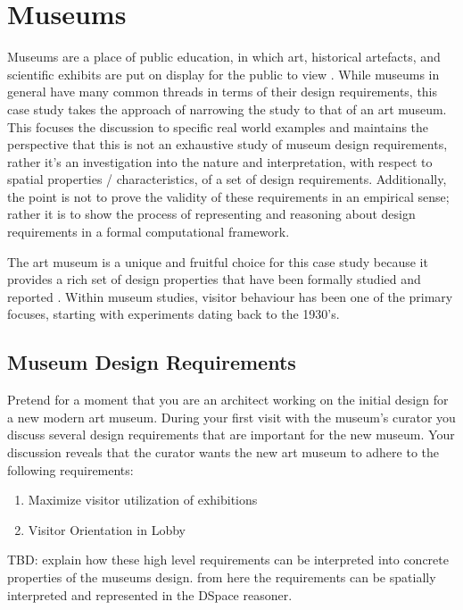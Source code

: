 \documentclass[12pt]{ucthesis}
\begin{document}
\section{Museums}
Museums are a place of public education, in which art, historical artefacts, and scientific exhibits are put on display for the public to view \cite{Falk}. While museums in general have many common threads in terms of their design requirements, this case study takes the approach of narrowing the study to that of an art museum. This focuses the discussion to specific real world examples and maintains the perspective that this is not an exhaustive study of museum design requirements, rather it's an investigation into the nature and interpretation, with respect to spatial properties / characteristics, of a set of design requirements. Additionally, the point is not to prove the validity of these requirements in an empirical sense; rather it is to show the process of representing and reasoning about design requirements in a formal computational framework.

The art museum is a unique and fruitful choice for this case study because it provides a rich set of design properties that have been formally studied and reported \cite{Melton} \cite{Bitgood02} \cite{Falk}. Within museum studies, visitor behaviour has been one of the primary focuses, starting with experiments dating back to the 1930's. 

\subsection{Museum Design Requirements}
Pretend for a moment that you are an architect working on the initial design for a new modern art museum. During your first visit with the museum's curator you discuss several design requirements that are important for the new museum. Your discussion reveals that the curator wants the new art museum to adhere to the following requirements:

\begin{enumerate}
\item Maximize visitor utilization of exhibitions
\item Visitor Orientation in Lobby
\end{enumerate}

TBD: explain how these high level requirements can be interpreted into concrete properties of the museums design. from here the requirements can be spatially interpreted and represented in the DSpace reasoner.
\end{document}
